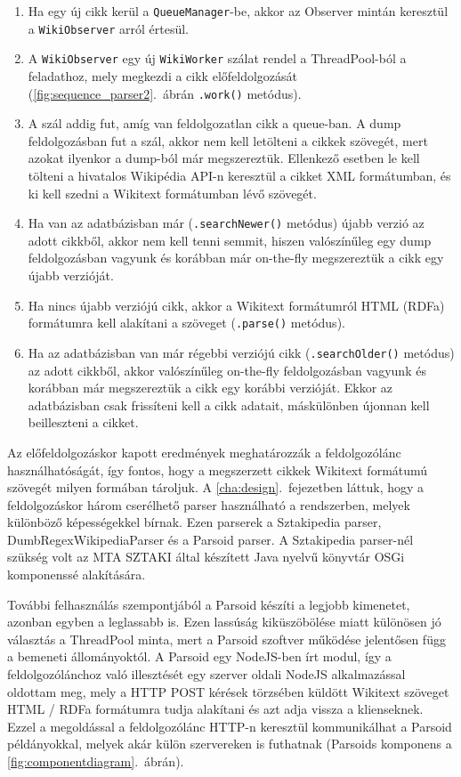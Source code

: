 \begin{enumerate}
	\item Ha egy új cikk kerül a \texttt{QueueManager}-be, akkor az Observer mintán keresztül a \texttt{WikiObserver} arról értesül.
	\item A \texttt{WikiObserver} egy új \texttt{WikiWorker} szálat rendel a ThreadPool-ból a feladathoz, mely megkezdi a cikk előfeldolgozását (\ref{fig:sequence_parser2}.~ábrán \texttt{.work()} metódus).
	\item A szál addig fut, amíg van feldolgozatlan cikk a queue-ban. A dump feldolgozásban fut a szál, akkor nem kell letölteni a cikkek szövegét, mert azokat ilyenkor a dump-ból már megszereztük. Ellenkező esetben le kell tölteni a hivatalos Wikipédia API-n keresztül a cikket XML formátumban, és ki kell szedni a Wikitext formátumban lévő szövegét.
	\item Ha van az adatbázisban már (\texttt{.searchNewer()} metódus) újabb verzió az adott cikkből, akkor nem kell tenni semmit, hiszen valószínűleg egy dump feldolgozásban vagyunk és korábban már on-the-fly megszereztük a cikk egy újabb verzióját.
	\item Ha nincs újabb verziójú cikk, akkor a Wikitext formátumról HTML (RDFa) formátumra kell alakítani a szöveget (\texttt{.parse()} metódus).
	\item Ha az adatbázisban van már régebbi verziójú cikk (\texttt{.searchOlder()} metódus) az adott cikkből, akkor valószínűleg on-the-fly feldolgozásban vagyunk és korábban már megszereztük a cikk egy korábbi verzióját. Ekkor az adatbázisban csak frissíteni kell a cikk adatait, máskülönben újonnan kell beilleszteni a cikket.
\end{enumerate}

Az előfeldolgozáskor kapott eredmények meghatározzák a feldolgozólánc használhatóságát, így fontos, hogy a megszerzett cikkek Wikitext formátumú szövegét milyen formában tároljuk. A \ref{cha:design}.~fejezetben láttuk, hogy a feldolgozáskor három cserélhető parser használható a rendszerben, melyek különböző képességekkel bírnak. Ezen parserek a Sztakipedia parser, DumbRegexWikipediaParser és a Parsoid parser. A Sztakipedia parser-nél szükség volt az MTA SZTAKI által készített Java nyelvű könyvtár OSGi komponenssé alakítására.

További felhasználás szempontjából a Parsoid készíti a legjobb kimenetet, azonban egyben a leglassabb is. Ezen lassúság kiküszöbölése miatt különösen jó választás a ThreadPool minta, mert a Parsoid szoftver működése jelentősen függ a bemeneti állományoktól. A Parsoid egy NodeJS-ben írt modul, így a feldolgozólánchoz való illesztését egy szerver oldali NodeJS alkalmazással oldottam meg, mely a HTTP POST kérések törzsében küldött Wikitext szöveget HTML / RDFa formátumra tudja alakítani és azt adja vissza a klienseknek. Ezzel a megoldással a feldolgozólánc HTTP-n keresztül kommunikálhat a Parsoid példányokkal, melyek akár külön szervereken is futhatnak (Parsoids komponens a \ref{fig:componentdiagram}.~ábrán).

